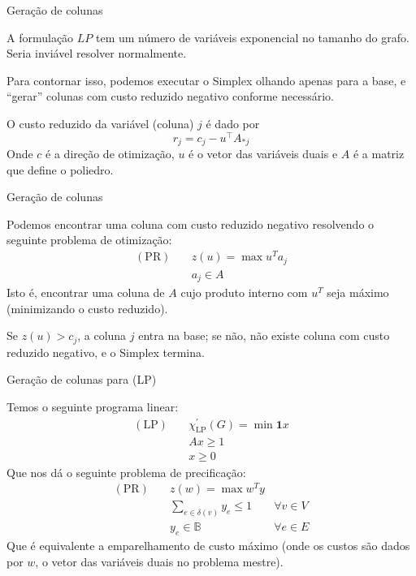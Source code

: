 \documentclass{beamer}
\begin{document}
    \begin{frame}{Geração de colunas}

        A formulação {\color{blue} $LP$} tem um número de variáveis exponencial no tamanho do grafo. Seria inviável resolver normalmente.

        \pause
        \vspace{0.5cm}
        Para contornar isso, podemos executar o Simplex olhando apenas para a base, e ``gerar'' colunas com custo reduzido negativo conforme necessário.

        \pause
        \vspace{0.5cm}
        O custo reduzido da variável (coluna) {\color{blue} $j$} é dado por
        {\color{blue} $$r_j = c_j - u^\top A_{*j}$$}
        Onde {\color{blue} $c$} é a direção de otimização, {\color{blue} $u$} é o vetor das variáveis duais e {\color{blue} $A$} é a matriz que define o poliedro.
    \end{frame}

    \begin{frame}{Geração de colunas}

        Podemos encontrar uma coluna com custo reduzido negativo resolvendo o seguinte problema de otimização:
        {\color{blue}
            \begin{align*}
                (\mathrm{PR})\quad&z(u) = \max u^T a_j\\
                &a_j \in A
            \end{align*}
        }
        Isto é, encontrar uma coluna de {\color{blue} $A$} cujo produto interno com {\color{blue} $u^T$} seja máximo (minimizando o custo reduzido).
        
        \pause
        \vspace{0.5cm}
        Se {\color{blue} $z(u) > c_j$}, a coluna {\color{blue} $j$} entra na base; se não, não existe coluna com custo reduzido negativo, e o Simplex termina.
    \end{frame}

    \begin{frame}{Geração de colunas para (LP)}
        
        Temos o seguinte programa linear:
        {\color{blue}
        \begin{align*}
            (\mathrm{LP})\quad&\chi^\prime_\mathrm{LP}(G) = \min \mathbf{1} x\\
            &A x \geq 1\\
            &x \geq 0
        \end{align*}}
        \pause
        Que nos dá o seguinte problema de precificação:
        {\color{blue}
        \begin{align*}
            (\mathrm{PR})\quad&z(w) = \max w^T y\\
            &\sum_{e \in \delta(v)} y_e \leq 1 &\forall v \in V\\
            &y_e \in \mathbb{B}&\forall e \in E
        \end{align*}}
        \pause
        Que é equivalente a emparelhamento de custo máximo (onde os custos são dados por {\color{blue} $w$}, o vetor das variáveis duais no problema mestre).
    \end{frame}
\end{document}
